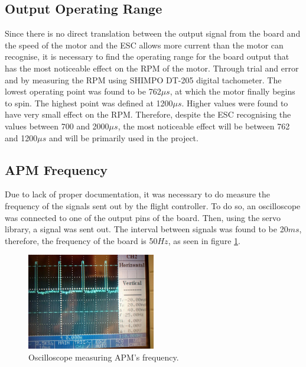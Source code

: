 \subsection{Output Operating Range}

Since there is no direct translation between the output signal from the board and the speed of the motor and the ESC allows more current than the motor can recognise, it is necessary to find the operating range for the board output that has the most noticeable effect on the RPM of the motor. Through trial and error and by measuring the RPM using SHIMPO DT-205 digital tachometer. The lowest operating point was found to be 762$\mu s$, at which the motor finally begins to spin. The highest point was defined at 1200$\mu s$. Higher values were found to have very small effect on the RPM.
Therefore, despite the ESC recognising the values between 700 and 2000$\mu s$, the most noticeable effect will be between 762 and 1200$\mu s$ and will be primarily used in the project.

\subsection{APM Frequency}
Due to lack of proper documentation, it was necessary to do measure the frequency of the signals sent out by the flight controller. To do so, an oscilloscope was connected to one of the output pins of the board. Then, using the servo library, a signal was sent out. The interval between signals was found to be 20$ms$, therefore, the frequency of the board is 50$Hz$, as seen in figure \ref{oscillo1}.
\begin{figure}[H]
  \centering
    \includegraphics[width=0.5\textwidth]{images/oscillo1.jpg}
	\caption{Oscilloscope measuring APM's frequency.}
	\label{oscillo1}
\end{figure}

